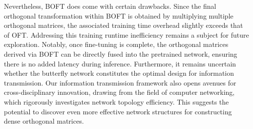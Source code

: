 Nevertheless, BOFT does come with certain drawbacks. Since the final orthogonal transformation within BOFT is obtained by multiplying multiple orthogonal matrices, the associated training time overhead slightly exceeds that of OFT. Addressing this training runtime inefficiency remains a subject for future exploration. Notably, once fine-tuning is complete, the orthogonal matrices derived via BOFT can be directly fused into the pretrained network, ensuring there is no added latency during inference. Furthermore, it remains uncertain whether the butterfly network constitutes the optimal design for information transmission. Our information transmission framework also opens avenues for cross-disciplinary innovation, drawing from the field of computer networking, which rigorously investigates network topology efficiency. This suggests the potential to discover even more effective network structures for constructing dense orthogonal matrices.

